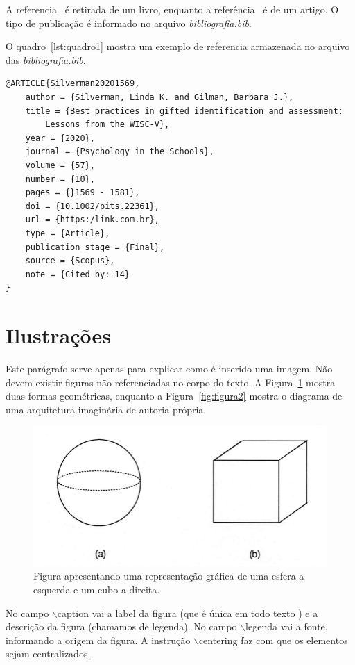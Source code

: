 A referencia~\cite{ericson2004real} é retirada de um livro, enquanto a referência~\cite{Silverman20201569} é de um artigo. O tipo de publicação é informado no arquivo \emph{bibliografia.bib}. 

O quadro~\ref{lst:quadro1} mostra um exemplo de referencia armazenada no arquivo das \emph{bibliografia.bib}.

\begin{lstlisting}[caption={Exemplo referência},label={lst:quadro1}]
@ARTICLE{Silverman20201569,
	author = {Silverman, Linda K. and Gilman, Barbara J.},
	title = {Best practices in gifted identification and assessment: 
		Lessons from the WISC-V},
	year = {2020},
	journal = {Psychology in the Schools},
	volume = {57},
	number = {10},
	pages = {}1569 - 1581},
	doi = {10.1002/pits.22361},
	url = {https:/link.com.br},
	type = {Article},
	publication_stage = {Final},
	source = {Scopus},
	note = {Cited by: 14}
}
\end{lstlisting}
	

\section{Ilustrações}\label{sec:ilustrações}
Este parágrafo serve apenas para explicar como é inserido uma imagem. Não devem existir figuras não referenciadas no corpo do texto. A Figura~\ref{fig:figura1} mostra duas formas geométricas, enquanto a Figura~\ref{fig:figura2} mostra o diagrama de uma arquitetura imaginária de autoria própria.

\begin{figure}[htb]
	\centering
	\caption{\label{fig:figura1} Figura apresentando uma representação gráfica de uma esfera a esquerda e um cubo a direita.}
	\includegraphics[width=\textwidth]{imgs/figura1.png}
\end{figure}

No campo $\backslash$caption vai a label da figura (que é única em todo texto ) e a descrição da figura (chamamos de legenda). No campo $\backslash$legenda vai a fonte, informando a origem da figura. A instrução $\backslash$centering faz com que os elementos sejam centralizados.


